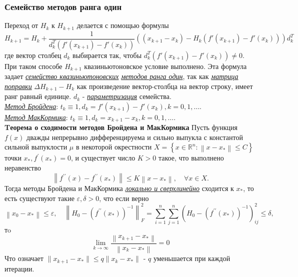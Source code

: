 \documentclass[A4]{article}
\begin{document}
\subsubsection{Семейство методов ранга один}
Переход от $H_k$ к $H_{k+1}$ делается с помощью формулы
\begin{equation*}
H_{k+1}=H_k+\frac{1}{d^T_k(f'(x_{k+1})-f'(x_k))}\left((x_{k+1}-x_k)-H_k(f'(x_{k+1})-f'(x_k))\right)d^T_k
\end{equation*}
где вектор столбец $d_k$ выбирается так, чтобы $d^T_k(f'(x_{k+1})-f'(x_k))\ne 0$. При таком способе $H_{k+1}$ квазиньютоновское условие выполнено. Эта формула задает \underline{\emph{семейство квазиньютоновских}} \underline{\emph{методов ранга один}}, так как \underline{\emph{матрица поправки}} $\Delta H_{k+1}-H_k$ как произведение вектор-столбца на вектор строку, имеет ранг равный единице. $d_k$ - \underline{\emph{параметризация}} семейства.\\
\underline{\emph{Метод Бройдена}}: $t_k\equiv 1,d_k=f'(x_{k+1})-f'(x_k),k=0,1,\ldots$.\\
\underline{\emph{Метод МакКормика}}:  $t_k\equiv 1,d_k=x_{k+1}-x_k,k=0,1,\ldots$.\\
\textbf{Tеорема о сходимости методов Бройдена и МакКормика} Пусть функция $ f(x) $ дважды непрерывно дифференцируема и сильно выпукла с константой сильной выпуклости $ \mu $ в некоторой окрестности $ X=\left\{x \in \mathbb{R}^{n}:\left\|x-x_{*}\right\| \leqslant C\right\} $ точки $ x_{*}, f^{\prime}\left(x_{*}\right)=0$, и существует число $ K>0 $ такое, что выполнено неравенство
\begin{equation*}
\left\|f^{\prime \prime}(x)-f^{\prime \prime}\left(x_{*}\right)\right\| \leqslant K\left\|x-x_{*}\right\|, \quad \forall x \in X .
\end{equation*}
Тогда методы Бройдена и МакКормика \underline{\emph{локально и сверхлинейно}} сходится к $ x_{*} $, то есть существуют такие $ \varepsilon, \delta>0$, что если верно
\begin{equation*}
\left\|x_{0}-x_{*}\right\| \leqslant \varepsilon, \quad\left\|H_{0}-\left(f^{\prime \prime}\left(x_{*}\right)\right)^{-1}\right\|_{F}^{2}=\sum_{i=1}^{n} \sum_{j=1}^{n}\left(H_{0}-\left(f^{\prime \prime}\left(x_{*}\right)\right)^{-1}\right)_{i j}^{2} \leqslant \delta,
\end{equation*}
тo
\begin{equation*}
\lim _{k \rightarrow \infty} \frac{\left\|x_{k+1}-x_{*}\right\|}{\left\|x_{k}-x_{*}\right\|}=0
\end{equation*}
Что означает $\|x_{k+1}-x_*\|\leqslant q\|x_k-x_*\|$ - $q$ уменьшается при каждой итерации.\\
\end{document}
